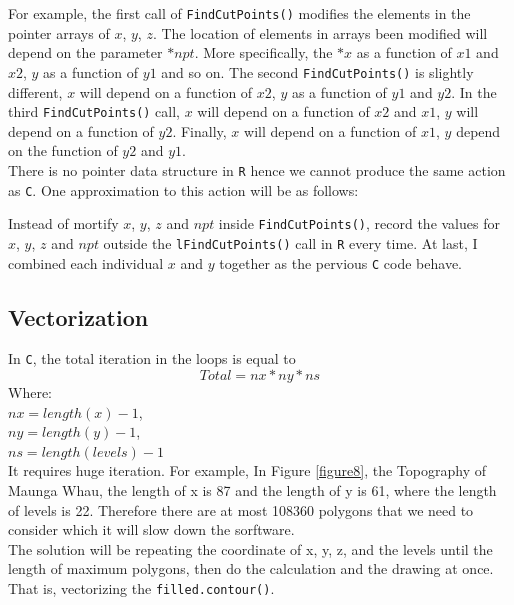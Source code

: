 \documentclass[paper=a4, fontsize=11pt]{report}
\begin{document}
For example, the first call of \texttt{FindCutPoints()} modifies the elements in the pointer arrays of $x$, $y$, $z$. The location of elements in arrays been modified will depend on the parameter $*npt$. More specifically, the $*x$ as a function of $x1$ and $x2$, $y$ as a function of $y1$ and so on. The second \texttt{FindCutPoints()} is slightly different, $x$ will depend on a function of $x2$, $y$ as a function of $y1$ and $y2$. In the third \texttt{FindCutPoints()} call, $x$ will depend on a function of $x2$ and $x1$, $y$ will depend on a function of $y2$. Finally, $x$ will depend on a function of $x1$, $y$ depend on the function of $y2$ and $y1$. \\

There is no pointer data structure in \texttt{R} hence we cannot produce the same action as \texttt{C}. One approximation to this action will be as follows:
\begin{Schunk}
\end{Schunk}
Instead of mortify $x$, $y$, $z$ and $npt$ inside \texttt{FindCutPoints()}, record the values for $x$, $y$, $z$ and $npt$ outside the \texttt{lFindCutPoints()} call in \texttt{R} every time. At last, I combined each individual $x$ and $y$ together as the pervious \texttt{C} code behave. 


\subsection{Vectorization}
In \texttt{C}, the total iteration in the loops is equal to
\begin{equation}
Total = nx * ny * ns
\end{equation}
Where:\\
$nx = length(x) - 1$,\\
$ny = length(y) - 1$,\\
$ns = length(levels) - 1$\\
It requires huge iteration. For example, In Figure \ref{figure8}, the Topography of Maunga Whau, the length of x is 87 and the length of y is 61, where the length of levels is 22. Therefore there are at most 108360 polygons that we need to consider which it will slow down the sorftware. \\
The solution will be repeating the coordinate of x, y, z, and the levels until the length of maximum polygons, then do the calculation and the drawing at once. That is, vectorizing the \texttt{filled.contour()}.\\
\end{document}

